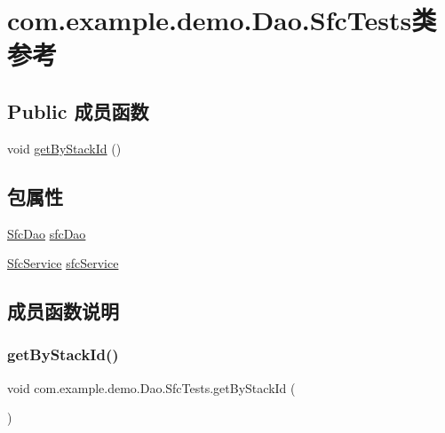 \hypertarget{classcom_1_1example_1_1demo_1_1_dao_1_1_sfc_tests}{}\section{com.\+example.\+demo.\+Dao.\+Sfc\+Tests类 参考}
\label{classcom_1_1example_1_1demo_1_1_dao_1_1_sfc_tests}
\subsection*{Public 成员函数}
\begin{DoxyCompactItemize}
\item 
void \mbox{\hyperlink{classcom_1_1example_1_1demo_1_1_dao_1_1_sfc_tests_ada70f7f202925725594d8c9ac30f42f7}{get\+By\+Stack\+Id}} ()
\end{DoxyCompactItemize}
\subsection*{包属性}
\begin{DoxyCompactItemize}
\item 
\mbox{\hyperlink{interfacecom_1_1example_1_1demo_1_1dao_1_1_sfc_dao}{Sfc\+Dao}} \mbox{\hyperlink{classcom_1_1example_1_1demo_1_1_dao_1_1_sfc_tests_af98124a16230770f5fc39f2a2dce6170}{sfc\+Dao}}
\item 
\mbox{\hyperlink{classcom_1_1example_1_1demo_1_1service_1_1_sfc_service}{Sfc\+Service}} \mbox{\hyperlink{classcom_1_1example_1_1demo_1_1_dao_1_1_sfc_tests_a4d15ad20e1d27bb9fc7531753e23d46a}{sfc\+Service}}
\end{DoxyCompactItemize}


\subsection{成员函数说明}
\mbox{\label{classcom_1_1example_1_1demo_1_1_dao_1_1_sfc_tests_ada70f7f202925725594d8c9ac30f42f7}} 
\subsubsection{\texorpdfstring{get\+By\+Stack\+Id()}{getByStackId()}}
{\footnotesize\ttfamily void com.\+example.\+demo.\+Dao.\+Sfc\+Tests.\+get\+By\+Stack\+Id (\begin{DoxyParamCaption}{ }\end{DoxyParamCaption})}



